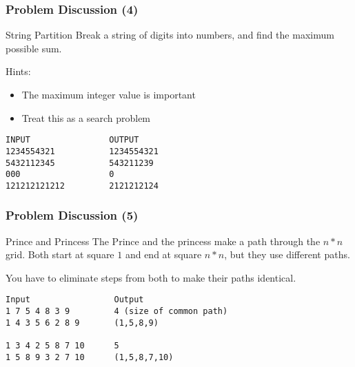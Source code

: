 \begin{frame}[fragile]
  \frametitle{Problem Discussion (4)}

  {\small
    \begin{block}{String Partition}
      Break a string of digits into numbers, and find the maximum possible sum.

      Hints:
      \begin{itemize}
      \item The maximum integer value is important
      \item Treat this as a search problem
      \end{itemize}
    \end{block}
\begin{verbatim}
INPUT                OUTPUT
1234554321           1234554321
5432112345           543211239
000                  0
121212121212         2121212124
\end{verbatim}
  }
\end{frame}

\begin{frame}[fragile]
  \frametitle{Problem Discussion (5)}

  {\small
    \begin{block}{Prince and Princess}
      The Prince and the princess make a path through the $n*n$
      grid. Both start at square $1$ and end at square $n*n$, but they
      use different paths.
      \medskip

      You have to eliminate steps from both to make their paths identical.
      \medskip

\begin{verbatim}
Input                 Output
1 7 5 4 8 3 9         4 (size of common path)
1 4 3 5 6 2 8 9       (1,5,8,9)

1 3 4 2 5 8 7 10      5 
1 5 8 9 3 2 7 10      (1,5,8,7,10)
\end{verbatim}
    \end{block}
  }
\end{frame}

